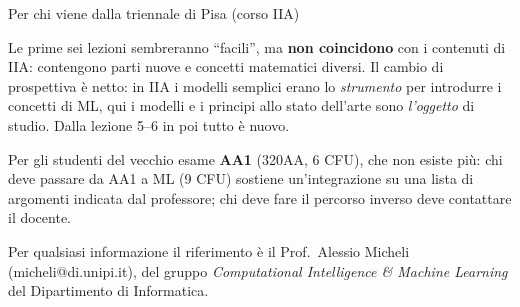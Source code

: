 \begin{boxwarning}{Per chi viene dalla triennale di Pisa (corso IIA)}

Le prime sei lezioni sembreranno ``facili'', ma \textbf{non coincidono}
con i contenuti di IIA: contengono parti nuove e concetti matematici
diversi. Il cambio di prospettiva è netto: in IIA i modelli semplici
erano lo \emph{strumento} per introdurre i concetti di ML, qui i modelli
e i principi allo stato dell'arte sono \emph{l'oggetto} di studio. Dalla
lezione 5--6 in poi tutto è nuovo.

\end{boxwarning}

Per gli studenti del vecchio esame \textbf{AA1} (320AA, 6 CFU), che non
esiste più: chi deve passare da AA1 a ML (9 CFU) sostiene
un'integrazione su una lista di argomenti indicata dal professore; chi
deve fare il percorso inverso deve contattare il docente.

Per qualsiasi informazione il riferimento è il Prof.~Alessio Micheli
(micheli@di.unipi.it), del gruppo \emph{Computational Intelligence \&
Machine Learning} del Dipartimento di Informatica.
